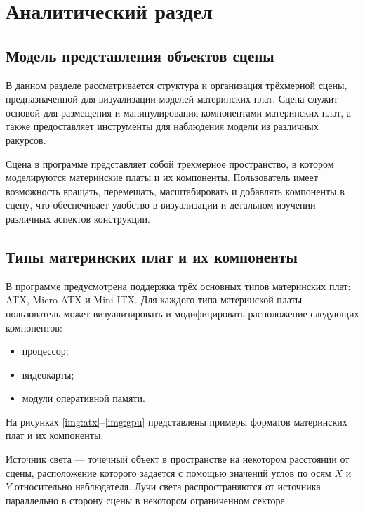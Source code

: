 \chapter{Аналитический раздел}

\section{Модель представления объектов сцены}

В данном разделе рассматривается структура и организация трёхмерной сцены, предназначенной для визуализации моделей материнских плат. Сцена служит основой для размещения и манипулирования компонентами материнских плат, а также предоставляет инструменты для наблюдения модели из различных ракурсов.

Сцена в программе представляет собой трехмерное пространство, в котором моделируются материнские платы и их компоненты. Пользователь имеет возможность вращать, перемещать, масштабировать и добавлять компоненты в сцену, что обеспечивает удобство в визуализации и детальном изучении различных аспектов конструкции.

\section{Типы материнских плат и их компоненты}

В программе предусмотрена поддержка трёх основных типов материнских плат: ATX, Micro-ATX и Mini-ITX. Для каждого типа материнской платы пользователь может визуализировать и модифицировать расположение следующих компонентов:
\begin{itemize}[label=---]
	\item процессор;
	\item видеокарты;
	\item модули оперативной памяти.
\end{itemize}

На рисунках \ref{img:atx}--\ref{img:gpu} представлены примеры форматов материнских плат и их компоненты.

\clearpage

Источник света --- точечный объект в пространстве на некотором расстоянии от сцены, расположение которого задается с помощью значений углов по осям $X$ и $Y$ относительно наблюдателя. Лучи света распространяются от источника параллельно в сторону сцены в некотором ограниченном секторе.

